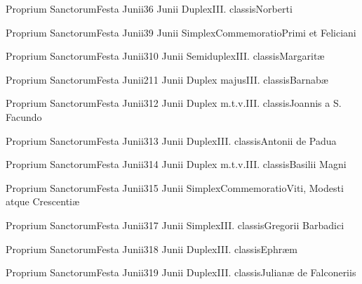 \documentclass[psalterium-feriale.tex]{subfiles}
\begin{document}
	{Proprium Sanctorum}{Festa Junii}{3}{6 Junii}
	{Duplex}{III. classis}{Norberti}
	{}
	{}
\COPOcdRubric

	{Proprium Sanctorum}{Festa Junii}{3}{9 Junii}
	{Simplex}{Commemoratio}{Primi et Feliciani}
	{}
	{}
\PMEXadRubric

	{Proprium Sanctorum}{Festa Junii}{3}{10 Junii}
	{Semiduplex}{III. classis}{Margaritæ}
	{}
	{}
\MUNNaRubric

	{Proprium Sanctorum}{Festa Junii}{2}{11 Junii}
	{Duplex majus}{III. classis}{Barnabæ}
	{\psalmodiapropria}
	{}

	{Proprium Sanctorum}{Festa Junii}{3}{12 Junii}
	{Duplex m.t.v.}{III. classis}{Joannis a S. Facundo}
	{}
	{}
\COPObRubric

	{Proprium Sanctorum}{Festa Junii}{3}{13 Junii}
	{Duplex}{III. classis}{Antonii de Padua}
	{}
	{}
\COPObRubric

	{Proprium Sanctorum}{Festa Junii}{3}{14 Junii}
	{Duplex m.t.v.}{III. classis}{Basilii Magni}
	{}
	{}
\COPOcRubric

	{Proprium Sanctorum}{Festa Junii}{3}{15 Junii}
	{Simplex}{Commemoratio}{Viti, Modesti atque Crescentiæ\linebreak\null}
	{}
	{}
\PMEXaRubric

	{Proprium Sanctorum}{Festa Junii}{3}{17 Junii}
	{Simplex}{III. classis}{Gregorii Barbadici}
	{}
	{}
\COPOaRubric

	{Proprium Sanctorum}{Festa Junii}{3}{18 Junii}
	{Duplex}{III. classis}{Ephræm} %
	{}
	{}
\COPOcRubric

	{Proprium Sanctorum}{Festa Junii}{3}{19 Junii}
	{Duplex}{III. classis}{Julianæ de Falconeriis}
	{}
	{}
\end{document}
